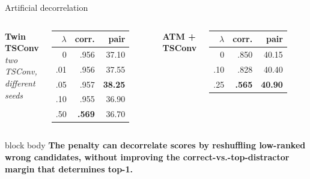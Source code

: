 \documentclass[aspectratio=169,10pt]{beamer}
\newcommand{\takeaway}[1]{%
  \vspace{0.3em}\begin{beamercolorbox}[rounded=true,sep=0.55em]{block body}
  \textbf{#1}
  \end{beamercolorbox}}
\begin{document}
\begin{frame}{Artificial decorrelation}
  \small
  \begin{columns}[T,onlytextwidth]
      \centering
      \textbf{Twin TSConv}\\[-0.05em]
      \textit{two TSConv, different seeds}

      \vspace{0.45em}
      \begin{tabular}{@{}rrr@{}}
        \toprule
        $\lambda$ & corr. & pair \\
        \midrule
        0 & .956 & 37.10 \\
        .01 & .956 & 37.55 \\
        .05 & .957 & \textbf{38.25} \\
        .10 & .955 & 36.90 \\
        .50 & \textbf{.569} & 36.70 \\
        \bottomrule
      \end{tabular}

      \centering
      \textbf{ATM + TSConv}

      \vspace{1.55em}
      \begin{tabular}{@{}rrr@{}}
        \toprule
        $\lambda$ & corr. & pair \\
        \midrule
        0 & .850 & 40.15 \\
        .10 & .828 & 40.40 \\
        .25 & \textbf{.565} & \textbf{40.90} \\
        \bottomrule
      \end{tabular}
  \end{columns}

  \vspace{0.9em}
  \takeaway{The penalty can decorrelate scores by reshuffling low-ranked wrong candidates,
  without improving the correct-vs.-top-distractor margin that determines top-1.}
\end{frame}
\end{document}
